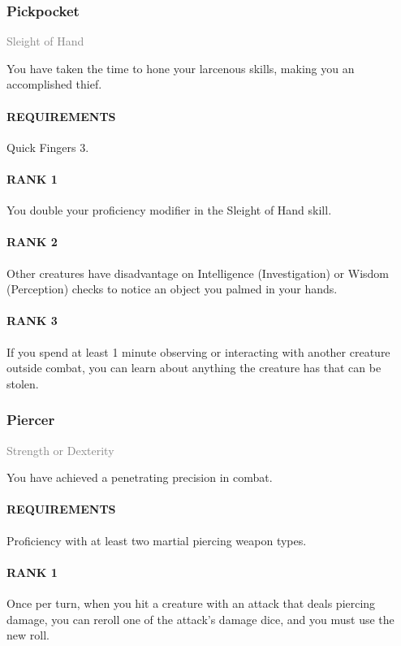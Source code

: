 \subsubsection{Pickpocket} \label{tal::pickpocket}
\small{\textcolor{gray}{Sleight of Hand}}

\normalsize
You have taken the time to hone your larcenous skills, making you an accomplished thief.
\paragraph{REQUIREMENTS} Quick Fingers 3.
\paragraph{RANK 1} You double your proficiency modifier in the Sleight of Hand skill.
\paragraph{RANK 2} Other creatures have disadvantage on Intelligence (Investigation) or Wisdom (Perception) checks to notice an object you palmed in your hands.
\paragraph{RANK 3} If you spend at least 1 minute observing or interacting with another creature outside combat, you can learn about anything the creature has that can be stolen.

\subsubsection{Piercer} \label{tal::piercer}
\small{\textcolor{gray}{Strength or Dexterity}}

\normalsize
You have achieved a penetrating precision in combat.
\paragraph{REQUIREMENTS} Proficiency with at least two martial piercing weapon types.
\paragraph{RANK 1} Once per turn, when you hit a creature with an attack that deals piercing damage, you can reroll one of the attack's damage dice, and you must use the new roll.
